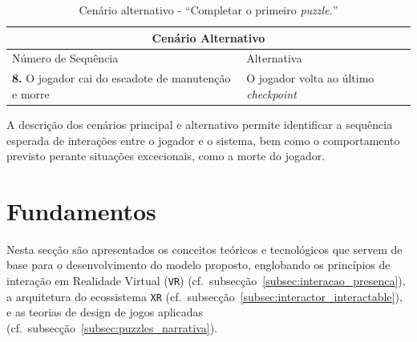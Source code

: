 \documentclass[a4paper, 12pt]{book}
\begin{document}
\begin{table}[H]
    \centering
    \begin{tabular}{|p{7cm}|p{7cm}|}
        \hline
        \multicolumn{2}{|c|}{\textbf{Cenário Alternativo}} \\ \hline
        Número de Sequência & Alternativa \\ \hline
        \textbf{8.} O jogador cai do escadote de manutenção e morre & O jogador volta ao último \textit{checkpoint}\\\hline
    \end{tabular}
    \caption{Cenário alternativo - ``Completar o primeiro \textit{puzzle.}''}
    \label{tab:cenário-alternativo}
\end{table}

A descrição dos cenários principal e alternativo permite identificar a sequência
esperada de interações entre o jogador e o sistema, bem como o comportamento
previsto perante situações excecionais, como a morte do jogador.

\section{Fundamentos}\label{sec:fundamentos}



Nesta secção são apresentados os conceitos teóricos e 
tecnológicos que servem de base para o desenvolvimento do modelo 
proposto, englobando os princípios de interação em Realidade Virtual (\texttt{VR}) 
(cf.~subsecção~\ref{subsec:interacao_presenca}), 
a arquitetura do ecossistema \texttt{XR} (cf.~subsecção~\ref{subsec:interactor_interactable}),
 e as teorias de design de jogos aplicadas (cf.~subsecção~\ref{subsec:puzzles_narrativa}).
\end{document}
